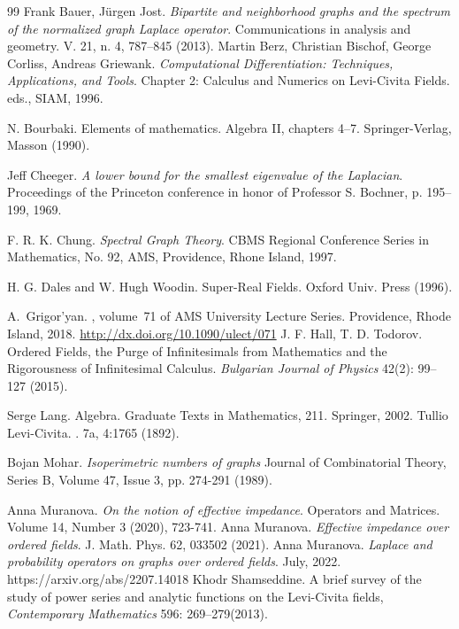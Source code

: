 \documentclass[a4paper,12pt]{amsart}
\theoremstyle{definition}
\begin{document}
\begin{thebibliography}{99}
%
Frank Bauer, J\"urgen Jost. \emph{Bipartite and neighborhood graphs and the
spectrum of the normalized graph Laplace operator}. Communications in analysis and geometry. V. 21, n. 4, 787--845 (2013).
%
 Martin Berz, Christian Bischof, George Corliss, Andreas Griewank. {\em Computational Differentiation: Techniques, Applications, and Tools}. Chapter 2: Calculus and Numerics on Levi-Civita Fields. eds., SIAM, 1996.

N. Bourbaki. Elements of mathematics. Algebra II, chapters 4--7. Springer-Verlag,  Masson (1990). 


Jeff Cheeger. {\em A lower bound for the smallest eigenvalue of the Laplacian}. Proceedings of the Princeton conference in honor of Professor S. Bochner, p. 195--199, 1969.

 F. R. K. Chung. {\em Spectral Graph Theory}. CBMS Regional Conference Series in Mathematics, No. 92, AMS, Providence, Rhone Island, 1997.

H. G. Dales and W. Hugh Woodin. Super-Real Fields. Oxford Univ. Press (1996).
%

A.~Grigor'yan.
, volume~71 of AMS
  University Lecture Series.
\newblock Providence, Rhode Island, 2018. \url{http://dx.doi.org/10.1090/ulect/071}
%
%
%
J. F. Hall, T. D. Todorov. Ordered Fields, the Purge of Infinitesimals from Mathematics and the Rigorousness of Infinitesimal Calculus. \emph{Bulgarian Journal of Physics} 42(2): 99--127 (2015).


Serge Lang. Algebra. Graduate Texts in Mathematics, 211. Springer, 2002.
% 
Tullio Levi-Civita. 
.
7a, 4:1765  (1892).

Bojan Mohar.
{\em Isoperimetric numbers of graphs}
Journal of Combinatorial Theory, Series B,
Volume 47, Issue 3, pp. 274-291 (1989).

 Anna Muranova.  \emph{On the notion of effective impedance}. Operators and Matrices. Volume 14, Number 3 (2020), 723-741.
%
 Anna Muranova.  \emph{Effective impedance over ordered fields}. J. Math. Phys. 62, 033502 (2021).
%
 Anna Muranova. {\em Laplace and probability operators on graphs over ordered fields}. July, 2022. https://arxiv.org/abs/2207.14018
%
Khodr Shamseddine. {A brief survey of the study of power series and analytic functions on the {Levi}-{Civita} fields}, \emph{Contemporary Mathematics} 596: 269--279(2013).



\end{thebibliography}
\end{document}
